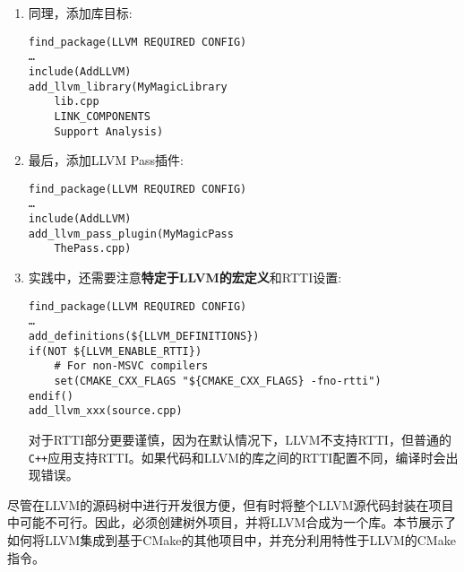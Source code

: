 \begin{enumerate}
\item 同理，添加库目标:
\begin{lstlisting}[style=styleCMake]
find_package(LLVM REQUIRED CONFIG)
…
include(AddLLVM)
add_llvm_library(MyMagicLibrary
	lib.cpp
	LINK_COMPONENTS
	Support Analysis)
\end{lstlisting}

\item 最后，添加LLVM Pass插件:
\begin{lstlisting}[style=styleCMake]
find_package(LLVM REQUIRED CONFIG)
…
include(AddLLVM)
add_llvm_pass_plugin(MyMagicPass
	ThePass.cpp)
\end{lstlisting}

\item 实践中，还需要注意\textbf{特定于LLVM的宏定义}和RTTI设置:
\begin{lstlisting}[style=styleCMake]
find_package(LLVM REQUIRED CONFIG)
…
add_definitions(${LLVM_DEFINITIONS})
if(NOT ${LLVM_ENABLE_RTTI})
	# For non-MSVC compilers
	set(CMAKE_CXX_FLAGS "${CMAKE_CXX_FLAGS} -fno-rtti")
endif()
add_llvm_xxx(source.cpp)
\end{lstlisting}

对于RTTI部分更要谨慎，因为在默认情况下，LLVM不支持RTTI，但普通的\texttt{C++}应用支持RTTI。如果代码和LLVM的库之间的RTTI配置不同，编译时会出现错误。

\end{enumerate}

尽管在LLVM的源码树中进行开发很方便，但有时将整个LLVM源代码封装在项目中可能不可行。因此，必须创建树外项目，并将LLVM合成为一个库。本节展示了如何将LLVM集成到基于CMake的其他项目中，并充分利用特性于LLVM的CMake指令。


































